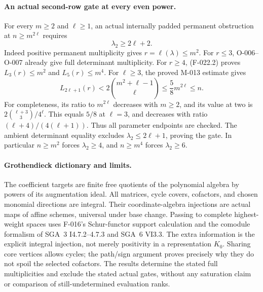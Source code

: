 \paragraph{An actual second-row gate at every even power.}
For every \(m\geq2\) and \(\ell\geq1\), an actual
internally padded permanent obstruction at
\(n\geq m^{2\ell}\) requires
\begin{equation}\label{eq:F022gate}
                              \lambda_2\geq2\ell+2.
\end{equation}
Indeed positive permanent multiplicity gives
\(r=\ell(\lambda)\leq m^2\). For \(r\leq3\),
O-006--O-007 already give full determinant multiplicity.
For \(r\geq4\), (F-022.2) proves
\(L_3(r)\leq m^2\) and \(L_5(r)\leq m^4\).
For \(\ell\geq3\), the proved M-013 estimate gives
\[
 L_{2\ell+1}(r)
    <2\binom{m^2+\ell-1}{\ell}
    \leq \frac58 m^{2\ell}\leq n.
\]
For completeness, its ratio to \(m^{2\ell}\) decreases
with \(m\geq2\), and its value at two is
\(2\binom{\ell+3}{3}/4^\ell\). This equals \(5/8\)
at \(\ell=3\), and decreases with ratio
\((\ell+4)/(4(\ell+1))\). Thus all parameter endpoints
are checked. The ambient determinant equality excludes
\(\lambda_2\leq2\ell+1\), proving the gate.
In particular \(n\geq m^2\) forces \(\lambda_2\geq4\),
and \(n\geq m^4\) forces \(\lambda_2\geq6\).

\paragraph{Grothendieck dictionary and limits.}
The coefficient targets are finite free quotients of the
polynomial algebra by powers of its augmentation ideal.
All matrices, cycle covers, cofactors, and chosen monomial
directions are integral. Their coordinate-algebra injections
are actual maps of affine schemes, universal under base
change. Passing to complete highest-weight spaces uses
F-016's Schur-functor support calculation and the comodule
formalism of SGA~3 I4.7.2--4.7.3 and SGA~6 VI3.3.
The extra information is the explicit integral injection,
not merely positivity in a representation \(K_0\).
Sharing core vertices allows cycles; the path/sign argument
proves precisely why they do not spoil the selected cofactors.
The results determine the stated full multiplicities and
exclude the stated actual gates, without any saturation
claim or comparison of still-undetermined evaluation ranks.
